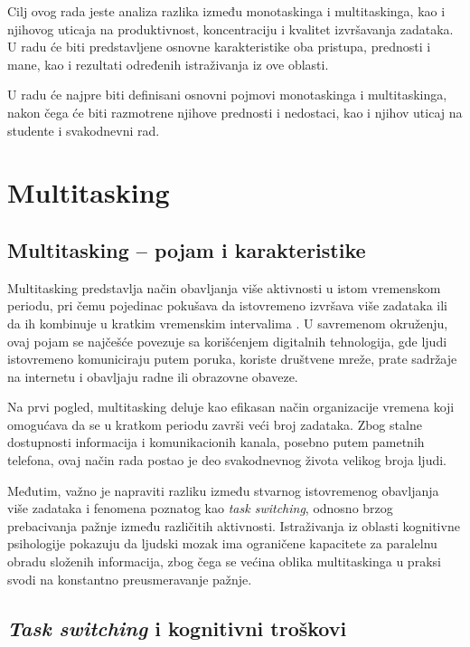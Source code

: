 \documentclass[12pt,a4paper]{article}
\begin{document}
Cilj ovog rada jeste analiza razlika između monotaskinga i multitaskinga, kao i njihovog uticaja na produktivnost, koncentraciju i kvalitet izvršavanja zadataka. U radu će biti predstavljene osnovne karakteristike oba pristupa, prednosti i mane, kao i rezultati određenih istraživanja iz ove oblasti.

U radu će najpre biti definisani osnovni pojmovi monotaskinga i multitaskinga, nakon čega će biti razmotrene njihove prednosti i nedostaci, kao i njihov uticaj na studente i svakodnevni rad.



\section{Multitasking}

\subsection{Multitasking – pojam i karakteristike}

Multitasking predstavlja način obavljanja više aktivnosti u istom vremenskom periodu, pri čemu pojedinac pokušava da istovremeno izvršava više zadataka ili da ih kombinuje u kratkim vremenskim intervalima \cite{APA}. U savremenom okruženju, ovaj pojam se najčešće povezuje sa korišćenjem digitalnih tehnologija, gde ljudi istovremeno komuniciraju putem poruka, koriste društvene mreže, prate sadržaje na internetu i obavljaju radne ili obrazovne obaveze.

Na prvi pogled, multitasking deluje kao efikasan način organizacije vremena koji omogućava da se u kratkom periodu završi veći broj zadataka. Zbog stalne dostupnosti informacija i komunikacionih kanala, posebno putem pametnih telefona, ovaj način rada postao je deo svakodnevnog života velikog broja ljudi.

Međutim, važno je napraviti razliku između stvarnog istovremenog obavljanja više zadataka i fenomena poznatog kao \textit{task switching}, odnosno brzog prebacivanja pažnje između različitih aktivnosti. Istraživanja iz oblasti kognitivne psihologije pokazuju da ljudski mozak ima ograničene kapacitete za paralelnu obradu složenih informacija, zbog čega se većina oblika multitaskinga u praksi svodi na konstantno preusmeravanje pažnje.


\subsection{\textit{Task switching} i kognitivni troškovi}
\end{document}
